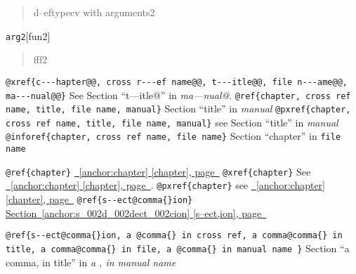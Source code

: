 \documentclass{book}
\begin{document}
%
\begin{quote}
d--eftypecv with arguments2
\end{quote}

\noindent\texttt{arg2}\hfill[fun2]



%
\begin{quote}
fff2
\end{quote}


\texttt{@xref\{c{-}{-}{-}hapter@@, cross r{-}{-}{-}ef name@@, t{-}{-}{-}itle@@, file n{-}{-}{-}ame@@, ma{-}{-}{-}nual@@\}} See Section ``t---itle@'' in \textsl{ma---nual@}.
\texttt{@ref\{chapter, cross ref name, title, file name, manual\}} Section ``title'' in \textsl{manual}
\texttt{@pxref\{chapter, cross ref name, title, file name, manual\}} see Section ``title'' in \textsl{manual}
\texttt{@inforef\{chapter, cross ref name, file name\}} Section ``chapter'' in \texttt{file name}

\texttt{@ref\{chapter\}} \hyperref[anchor:chapter]{\chaptername~\ref*{anchor:chapter} [chapter], page~\pageref*{anchor:chapter}}
\texttt{@xref\{chapter\}} See \hyperref[anchor:chapter]{\chaptername~\ref*{anchor:chapter} [chapter], page~\pageref*{anchor:chapter}}.
\texttt{@pxref\{chapter\}} see \hyperref[anchor:chapter]{\chaptername~\ref*{anchor:chapter} [chapter], page~\pageref*{anchor:chapter}}
\texttt{@ref\{s{-}{-}ect@comma\{\}ion\}} \hyperref[anchor:s_002d_002dect_002cion]{Section~\ref*{anchor:s_002d_002dect_002cion} [s--ect,ion], page~\pageref*{anchor:s_002d_002dect_002cion}}

\texttt{@ref\{s{-}{-}ect@comma\{\}ion, a @comma\{\} in cross
ref, a comma@comma\{\} in title, a comma@comma\{\} in file, a @comma\{\} in manual name \}}
Section ``a comma, in title'' in \textsl{a , in manual name}
\end{document}
